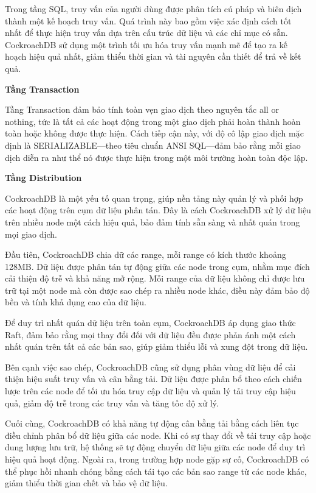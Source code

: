 \documentclass{article}[14pt]
\begin{document}
Trong tầng SQL, truy vấn của người dùng được phân tích cú pháp và biên dịch thành một kế hoạch truy vấn. Quá trình này bao gồm việc xác định cách tốt nhất để thực hiện truy vấn dựa trên cấu trúc dữ liệu và các chỉ mục có sẵn. CockroachDB sử dụng một trình tối ưu hóa truy vấn mạnh mẽ để tạo ra kế hoạch hiệu quả nhất, giảm thiểu thời gian và tài nguyên cần thiết để trả về kết quả.


\textbf{Tầng Transaction}

Tầng Transaction đảm bảo tính toàn vẹn giao dịch theo nguyên tắc all or nothing, tức là tất cả các hoạt động trong một giao dịch phải hoàn thành hoàn toàn hoặc không được thực hiện. Cách tiếp cận này, với độ cô lập giao dịch mặc định là SERIALIZABLE—theo tiêu chuẩn ANSI SQL—đảm bảo rằng mỗi giao dịch diễn ra như thể nó được thực hiện trong một môi trường hoàn toàn độc lập.

\textbf{Tầng Distribution}

CockroachDB là một yếu tố quan trọng, giúp nền tảng này quản lý và phối hợp các hoạt động trên cụm dữ liệu phân tán. Đây là cách CockroachDB xử lý dữ liệu trên nhiều node một cách hiệu quả, bảo đảm tính sẵn sàng và nhất quán trong mọi giao dịch.

Đầu tiên, CockroachDB chia dữ các range, mỗi range có kích thước khoảng 128MB. Dữ liệu được phân tán tự động giữa các node trong cụm, nhằm mục đích cải thiện độ trễ và khả năng mở rộng. Mỗi range của dữ liệu không chỉ được lưu trữ tại một node mà còn được sao chép ra nhiều node khác, điều này đảm bảo độ bền và tính khả dụng cao của dữ liệu.

Để duy trì nhất quán dữ liệu trên toàn cụm, CockroachDB áp dụng giao thức Raft, đảm bảo rằng mọi thay đổi đối với dữ liệu đều được phản ánh một cách nhất quán trên tất cả các bản sao, giúp giảm thiểu lỗi và xung đột trong dữ liệu.

Bên cạnh việc sao chép, CockroachDB cũng sử dụng phân vùng dữ liệu để cải thiện hiệu suất truy vấn và cân bằng tải. Dữ liệu được phân bổ theo cách chiến lược trên các node để tối ưu hóa truy cập dữ liệu và quản lý tải truy cập hiệu quả, giảm độ trễ trong các truy vấn và tăng tốc độ xử lý.

Cuối cùng, CockroachDB có khả năng tự động cân bằng tải bằng cách liên tục điều chỉnh phân bổ dữ liệu giữa các node. Khi có sự thay đổi về tải truy cập hoặc dung lượng lưu trữ, hệ thống sẽ tự động chuyển dữ liệu giữa các node để duy trì hiệu quả hoạt động. Ngoài ra, trong trường hợp node gặp sự cố, CockroachDB có thể phục hồi nhanh chóng bằng cách tái tạo các bản sao range từ các node khác, giảm thiểu thời gian chết và bảo vệ dữ liệu.
\end{document}
